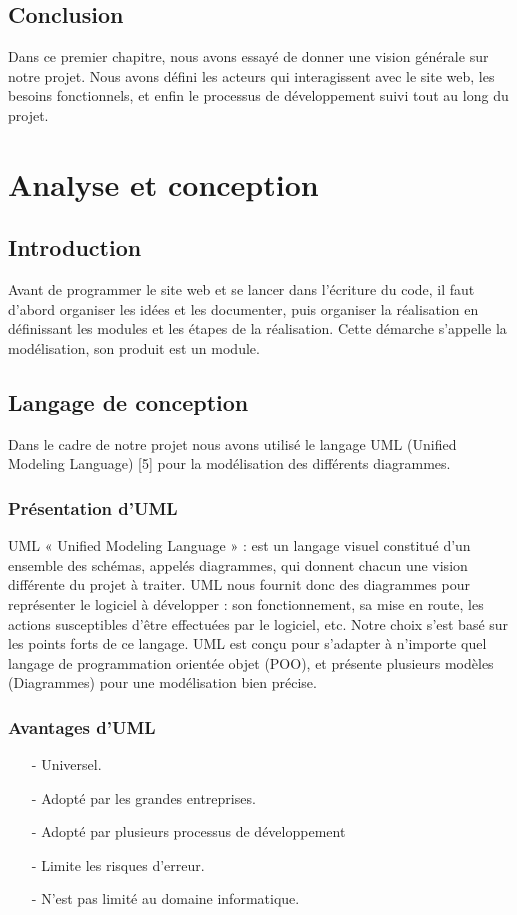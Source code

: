 \documentclass[11.5pt]{report}
\begin{document}
\section{Conclusion}
Dans ce premier chapitre, nous avons essayé de donner une vision générale sur notre projet. Nous avons défini les acteurs qui interagissent avec le site web, les besoins fonctionnels, et enfin le processus de développement suivi tout au long du projet. 

\chapter{Analyse et conception}
\newpage
\section{Introduction}

Avant de programmer le site web et se lancer dans l’écriture du code, il faut d’abord organiser les idées et les documenter, puis organiser la réalisation en définissant les modules et les étapes de la réalisation. Cette démarche s’appelle la modélisation, son produit est un module.

\section{Langage de conception }
Dans le cadre de notre projet nous avons utilisé le langage UML (Unified Modeling Language) [5] pour la modélisation des différents diagrammes.
\subsection{Présentation d’UML }
UML « Unified Modeling Language » : est un langage visuel constitué d’un ensemble des schémas, appelés diagrammes, qui donnent chacun une vision différente du projet à traiter.
UML nous fournit donc des diagrammes pour représenter le logiciel à développer : son fonctionnement, sa mise en route, les actions susceptibles d’être effectuées par le logiciel, etc.
Notre choix s'est basé sur les points forts de ce langage. UML est conçu pour s'adapter à n'importe quel langage de programmation orientée objet (POO), et présente plusieurs modèles (Diagrammes) pour une modélisation bien précise.\\

\subsection{Avantages d’UML }
\begin{itemize}
	\item [-] Universel.
	\item [-] Adopté par les grandes entreprises. 
	\item [-] Adopté par plusieurs processus de développement 
	\item [-] Limite les risques d’erreur. 
	\item [-] N’est pas limité au domaine informatique.
	
\end{itemize}
\end{document}
